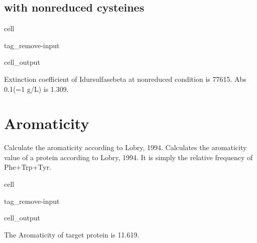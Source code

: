 \documentclass[letterpaper,10pt,english]{jupyterBook}
\begin{document}
\subsection{with non\sphinxhyphen{}reduced cysteines}
\label{\detokenize{ipynb/chapter1:with-non-reduced-cysteines}}
\begin{sphinxuseclass}{cell}
\begin{sphinxuseclass}{tag_remove-input}\begin{sphinxVerbatimOutput}

\begin{sphinxuseclass}{cell_output}
\begin{sphinxVerbatim}[commandchars=\\\{\}]
Extinction coefficient of Idursulfasebeta at non\PYGZhy{}reduced condition is 77615.
Abs 0.1\PYGZpc{}(=1 g/L) is 1.309.
\end{sphinxVerbatim}

\end{sphinxuseclass}\end{sphinxVerbatimOutput}

\end{sphinxuseclass}
\end{sphinxuseclass}

\section{Aromaticity}
\label{\detokenize{ipynb/chapter1:aromaticity}}
\sphinxAtStartPar
Calculate the aromaticity according to Lobry, 1994. Calculates the aromaticity value of a protein according to Lobry, 1994. It is simply the relative frequency of Phe+Trp+Tyr.

\begin{sphinxuseclass}{cell}
\begin{sphinxuseclass}{tag_remove-input}\begin{sphinxVerbatimOutput}

\begin{sphinxuseclass}{cell_output}
\begin{sphinxVerbatim}[commandchars=\\\{\}]
The Aromaticity of target protein is 11.619\PYGZpc{}.
\end{sphinxVerbatim}

\end{sphinxuseclass}\end{sphinxVerbatimOutput}

\end{sphinxuseclass}
\end{sphinxuseclass}
\end{document}
